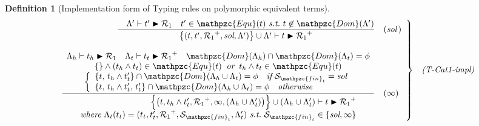 \documentclass[12pt]{article}
\newtheorem{Definition}{Definition}[section]
\begin{document}
\begin{Definition}[Implementation form of Typing rules on
    polymorphic equivalent terms]
\begin{displaymath}
\begin{array}{c}
      \begin{array}{rl}
        \left. \begin{array}{rl}
          \dfrac{
            \quad \Lambda' \vdash t' \blacktriangleright \mathcal{R}_1 \quad
             t' \in \mathpzc{Equ}(t)\ \text{\it s.t.}\ t \not\in
              \mathpzc{Dom}(\Lambda')
          }{
            \bigl\{(t, t', {\mathcal{R}_1}^+, \text{\it sol}, \Lambda')
             \bigr\} \cup \Lambda' \vdash
              t \blacktriangleright {\mathcal{R}_1}^+
          }  &  (\text{\it sol}\,)  \\
          \\
          \dfrac{
            \begin{array}{c}
              \Lambda_h \vdash t_h \blacktriangleright \mathcal{R}_1
               \quad \Lambda_t \vdash t_t \blacktriangleright {\mathcal{R}_1}^+
                \quad \mathpzc{Dom}(\Lambda_h) \cap \mathpzc{Dom}(\Lambda_t)
                 = \phi  \\
              \{\} \wedge (t_h \wedge t_t) \in \mathpzc{Equ}(t)\;\;
               \text{\it or}\;\; t_h \wedge t_t \in \mathpzc{Equ}(t)  \\
              \left\{\begin{array}{l}
                \{t,\, t_h \wedge t'_t \} \cap \mathpzc{Dom}(
                 \Lambda_h \cup \Lambda_t) = \phi\quad \text{\it if}\
                  \mathcal{S}_{\mathpzc{fin}_t} = \text{\it sol}  \\
                \{t,\, t_h \wedge t'_t,\, t'_t \} \cap \mathpzc{Dom}(
                 \Lambda_h \cup \Lambda_t) = \phi\quad \text{\it otherwise}
              \end{array}\right.
            \end{array}
          }{
            \begin{array}{r}
              \Bigl\{\bigl(t, t_h \wedge t_t', {\mathcal{R}_1}^+, \infty,
               (\Lambda_h \cup \Lambda_t') \bigr) \Bigr\} \cup
                (\Lambda_h \cup \Lambda_t') \vdash
                 t \blacktriangleright {\mathcal{R}_1}^+  \\
              \text{\it where}\
               \Lambda_t(t_t) = (t_t, t_t', {\mathcal{R}_1}^+,
                \mathcal{S}_{\mathpzc{fin}_t}, \Lambda_t')\ \text{\it s.t.}\
                 \mathcal{S}_{\mathpzc{fin}_t} \in \{\text{\it sol}, \infty\}
            \end{array}
          }  &  (\infty)
        \end{array} \right\}  &  \text{\it (T-Cat1-impl)}
      \end{array}  \\
      \\
      

\end{array}
\end{displaymath}
\end{Definition}
\end{document}
